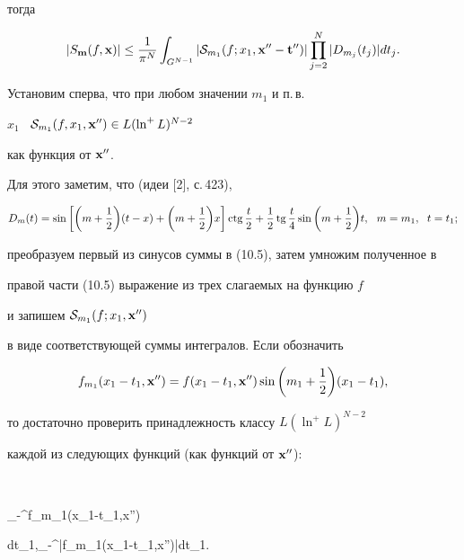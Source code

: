 тогда


\begin{equation}


|S_{{\bold m}}(f,{\bold x})|\le\frac{1}{\pi^N}\int_{G^{N-1}}


|{\cal S}_{m_1}(f;x_1,{\bold x}''-{\bold t}'')|


\prod_{j=2}^{N}|D_{m_j}(t_j)|dt_j.


\end{equation}


Установим сперва, что при любом значении $m_1$ и п.\,в.


$x_1$ \ ${\cal S}_{m_1}(f,x_1,{\bold x}'')\in L(\ln^+L)^{N-2}$


как функция от ${\bold x}''$.


Для этого заметим, что (идеи [2], с.\,423), 


\begin{equation}


D_m(t)=\sin\bigg[\bigg(m+\frac{1}{2}\bigg)(t-x)+


\bigg(m+\frac{1}{2}\bigg)x\bigg] \ctg \frac{t}{2} +


\frac{1}{2} \tg\frac{t}{4} \sin \bigg(m+\frac{1}{2}\bigg)t,


\ \ m=m_1,\ \; t=t_1;


\end{equation}


преобразуем первый из синусов суммы в (10.5), затем умножим полученное в 


правой части (10.5) выражение из трех слагаемых на функцию $f$


и запишем ${\cal S}_{m_1}(f;x_1,{\bold x}'')$


в виде соответствующей суммы интегралов. Если обозначить


$$


f_{m_1}(x_1-t_1,{\bold x}'')=f(x_1-t_1,{\bold x}'')


\sin \bigg(m_1+\frac{1}{2}\bigg)(x_1-t_1),


$$


то достаточно проверить принадлежность классу $L(\ln^+ L)^{N-2}$


каждой из следующих функций (как функций от ${\bold x}''$):


$$


\int_{-\pi}^\pi f_{m_1}(x_1-t_1,{\bold x}'')


 \ctg {}


dt_1,\quad {}\int_{-\pi}^\pi |f_{m_1}(x_1-t_1,{\bold x}'')|dt_1.


